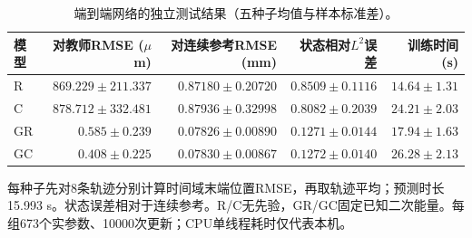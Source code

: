 \begin{table}[t]
\centering\small
\caption{端到端网络的独立测试结果（五种子均值与样本标准差）。}
\label{tab:neural}
\begin{tabular}{lrrrr}
\toprule
模型 & 对教师RMSE ($\mu$m) & 对连续参考RMSE (mm) & 状态相对$L^2$误差 & 训练时间 (s) \\
\midrule
R & $869.229 \pm 211.337$ & $0.87180 \pm 0.20720$ & $0.8509 \pm 0.1116$ & $14.64 \pm 1.31$ \\
C & $878.712 \pm 332.481$ & $0.87936 \pm 0.32998$ & $0.8082 \pm 0.2039$ & $24.21 \pm 2.03$ \\
GR & $0.585 \pm 0.239$ & $0.07826 \pm 0.00890$ & $0.1271 \pm 0.0144$ & $17.94 \pm 1.63$ \\
GC & $0.408 \pm 0.225$ & $0.07830 \pm 0.00867$ & $0.1272 \pm 0.0140$ & $26.28 \pm 2.13$ \\
\bottomrule
\end{tabular}
\par\smallskip\begin{minipage}{0.96\textwidth}\footnotesize 每种子先对8条轨迹分别计算时间域末端位置RMSE，再取轨迹平均；预测时长15.993 s。状态误差相对于连续参考。R/C无先验，GR/GC固定已知二次能量。每组673个实参数、10000次更新；CPU单线程耗时仅代表本机。\end{minipage}
\end{table}
